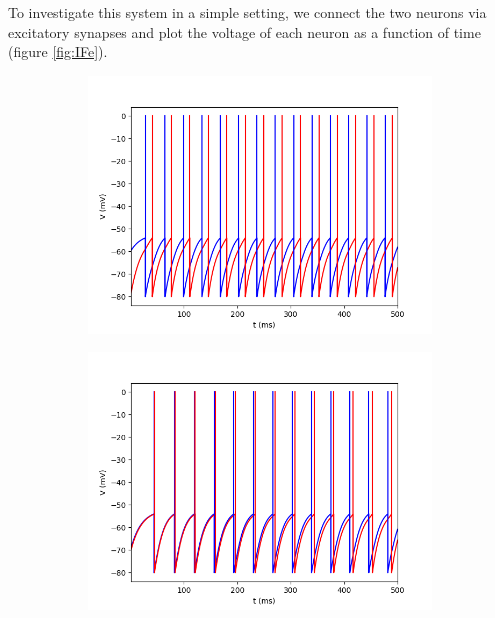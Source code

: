 \documentclass{article}
\begin{document}
To investigate this system in a simple setting, we connect the two neurons via excitatory synapses and plot the voltage of each neuron as a function of time (figure \ref{fig:IFe}).

\begin{figure}[h]
	\centering
	\begin{subfigure}[t]{0.30\linewidth}
		\centering
		\includegraphics[width = 1.0\linewidth, trim={0 0 0 0}, clip=true]{V_60_80e.png}
		\label{fig:V80e}	
	\end{subfigure}%
	\hspace{0.03\linewidth}
	\begin{subfigure}[t]{0.30\linewidth}
		\centering
		\includegraphics[width = 1.0\linewidth, trim={0 0 0 0}, clip=true]{V_70_71e.png}

\end{subfigure}
\end{figure}
\end{document}
